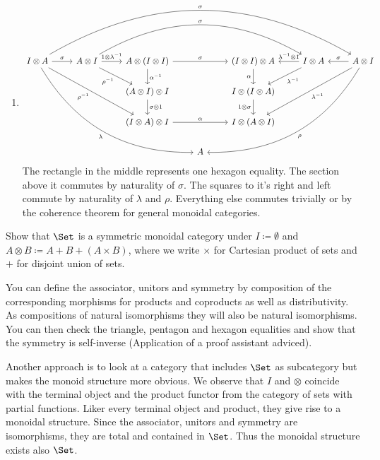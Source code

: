 \begin{answer}
\begin{enumerate}
\begin{enumerate}
    \item
      \[ \begin{tikzcd}
        I \otimes A
          \arrow[rrrrrr, bend left, "\sigma"]
          \arrow[r, "\sigma"]
          \arrow[rrdd, "\rho^{-1}"']
          \arrow[rrrddd, bend right, "\lambda"'] &
        A \otimes I
          \arrow[rrrr, bend left, "\sigma"]
          \arrow[r, "1 \otimes \lambda^{-1}"]
          \arrow[rd, "\rho^{-1}"'] &
        A \otimes (I \otimes I)
          \arrow[rr, "\sigma"]
          \arrow[d, "\alpha^{-1}"] &&
        (I \otimes I) \otimes A
          \arrow[d, "\alpha"'] &
        I \otimes A
          \arrow[l, "\lambda^{-1} \otimes 1"']
          \arrow[ld, "\lambda^{-1}"] &
        A \otimes I
          \arrow[l, "\sigma"']
          \arrow[lldd, "\lambda^{-1}"]
          \arrow[lllddd, bend left, "\rho"] \\
        && (A \otimes I) \otimes I
          \arrow[d, "\sigma \otimes 1"] &&
        I \otimes (I \otimes A)
          \arrow[d, "1 \otimes \sigma"'] \\
        && (I \otimes A) \otimes I
          \arrow[rr, "\alpha"] &&
        I \otimes (A \otimes I) \\
        &&& A
      \end{tikzcd} \]
      The rectangle in the middle represents one hexagon equality.
      The section above it commutes by naturality of $\sigma$.
      The squares to it's right and left commute by naturality of $\lambda$ and $\rho$.
      Everything else commutes trivially or by the coherence theorem for general monoidal categories.
    \end{enumerate}
  \end{enumerate}
\end{answer}


\begin{exercise}
  Show that $\Set$ is a symmetric monoidal category under $I \coloneqq \emptyset$ and $A \otimes B \coloneqq A + B + (A \times B)$, where we write $\times$ for Cartesian product of sets and $+$ for disjoint union of sets.
\end{exercise}

\begin{answer}
  You can define the associator, unitors and symmetry by composition of the corresponding morphisms for products and coproducts as well as distributivity.
  As compositions of natural isomorphisms they will also be natural isomorphisms.
  You can then check the triangle, pentagon and hexagon equalities and show that the symmetry is self-inverse (Application of a proof assistant adviced).

  Another approach is to look at a category that includes $\Set$ as subcategory but makes the monoid structure more obvious.
  We observe that $I$ and $\otimes$ coincide with the terminal object and the product functor from the category of sets with partial functions.
  Liker every terminal object and product, they give rise to a monoidal structure.
  Since the associator, unitors and symmetry are isomorphisms, they are total and contained in $\Set$.
  Thus the monoidal structure exists also $\Set$.
\end{answer}


